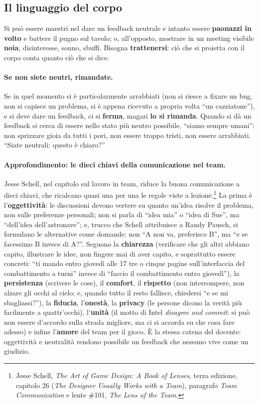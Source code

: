 \subsection{Il linguaggio del corpo}

Si può essere maestri nel dare un feedback neutrale e intanto essere
\textbf{paonazzi in volto} e battere il pugno sul tavolo; o, all'opposto,
mostrare in un meeting visibile \textbf{noia}, disinteresse, sonno, sbuffi.
Bisogna \textbf{trattenersi}: ciò che si proietta con il corpo conta quanto
ciò che si dice.

\paragraph{Se non siete neutri, rimandate.} Se in quel momento si è
particolarmente arrabbiati (non si riesce a fixare un bug, non si capisce un
problema, si è appena ricevuto a propria volta ``un cazziatone''), e si deve
dare un feedback, ci si \textbf{ferma}, magari \textbf{lo si rimanda}.
Quando si dà un feedback si cerca di essere nello stato più neutro
possibile, ``siamo sempre umani'': non sprizzare gioia da tutti i pori, non
essere troppo tristi, non essere arrabbiati. ``Siate neutrali: questo è
chiaro?''

\paragraph{Approfondimento: le dieci chiavi della comunicazione nel team.}
Jesse Schell, nel capitolo sul lavoro in team, riduce la buona comunicazione
a dieci chiavi, che ricalcano quasi una per una le regole viste a
lezione.\footnote{Jesse Schell, \emph{The Art of Game Design: A Book of
Lenses}, terza edizione, capitolo 26 (\emph{The Designer Usually Works with
a Team}), paragrafo \emph{Team Communication} e lente \#101, \emph{The Lens
of the Team}.} La prima è l'\textbf{oggettività}: le discussioni devono
vertere su quanto un'idea risolve il problema, non sulle preferenze
personali; non si parla di ``idea mia'' o ``idea di Sue'', ma ``dell'idea
dell'astronave''; e, trucco che Schell attribuisce a Randy Pausch, si
formulano le alternative come domande: non ``A non va, preferisco B'', ma
``e se facessimo B invece di A?''. Seguono la \textbf{chiarezza} (verificare
che gli altri abbiano capito, illustrare le idee, non fingere mai di aver
capito, e soprattutto essere concreti: ``ti mando entro giovedì alle 17 tre o
cinque pagine sull'interfaccia del combattimento a turni'' invece di ``faccio
il combattimento entro giovedì''), la \textbf{persistenza} (scrivere le
cose), il \textbf{comfort}, il \textbf{rispetto} (non interrompere, non
alzare gli occhi al cielo; e, quando tutto il resto fallisce, chiedersi ``e
se mi sbagliassi?''), la \textbf{fiducia}, l'\textbf{onestà}, la
\textbf{privacy} (le persone dicono la verità più facilmente a quattr'occhi),
l'\textbf{unità} (il motto di Intel \emph{disagree and commit}: si può non
essere d'accordo sulla strada migliore, ma ci si accorda su che cosa fare
adesso) e infine l'\textbf{amore} del team per il gioco. È la stessa catena
del docente: oggettività e neutralità rendono possibile un feedback che
nessuno vive come un giudizio.

